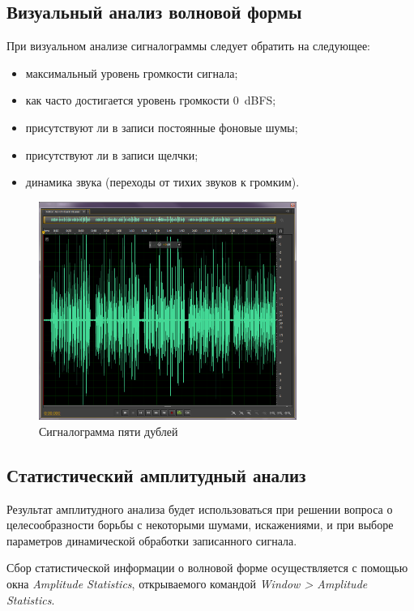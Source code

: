 \documentclass[oneside, final, 14pt]{extreport}
\begin{document}
\subsection{Визуальный анализ волновой формы}
При визуальном анализе сигналограммы следует обратить на следующее:
\begin{itemize}
\item максимальный уровень громкости сигнала;
\item как часто достигается уровень громкости $0$~dBFS;
\item присутствуют ли в записи постоянные фоновые шумы;
\item присутствуют ли в записи щелчки;
\item динамика звука (переходы от тихих звуков к громким).
\end{itemize}

\begin{figure}[h]
\centering
\includegraphics[width=0.75\textwidth]{pic-fivedoubles-01}
\caption{Сигналограмма пяти дублей}
\label{pic-fivedoubles-01}
\end{figure}

\subsection{Статистический амплитудный анализ}
Результат амплитудного анализа будет использоваться при решении вопроса о целесообразности борьбы с некоторыми шумами, искажениями, и при выборе параметров динамической обработки записанного сигнала.

Сбор статистической информации о волновой форме осуществляется с помощью окна \textit{Amplitude Statistics}, открываемого командой \textit{Window > Amplitude Statistics}.
\end{document}

